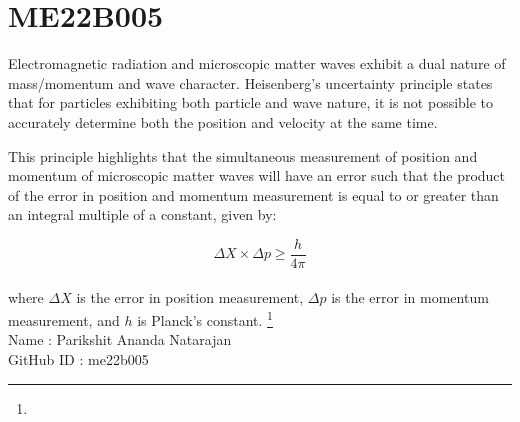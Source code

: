 \section{ME22B005}

Electromagnetic radiation and microscopic matter waves exhibit a dual nature of mass/momentum and wave character. Heisenberg's uncertainty principle states that for particles exhibiting both particle and wave nature, it is not possible to accurately determine both the position and velocity at the same time.

This principle highlights that the simultaneous measurement of position and momentum of microscopic matter waves will have an error such that the product of the error in position and momentum measurement is equal to or greater than an integral multiple of a constant, given by:

\begin{equation}
\Delta X \times \Delta p \ge \frac{h}{4\pi}
\end{equation}
\\
where $\Delta X$ is the error in position measurement, $\Delta p$ is the error in momentum measurement, and $h$ is Planck's constant.
\footnote{}
\\
Name : Parikshit Ananda Natarajan \\
GitHub ID : me22b005 \\
